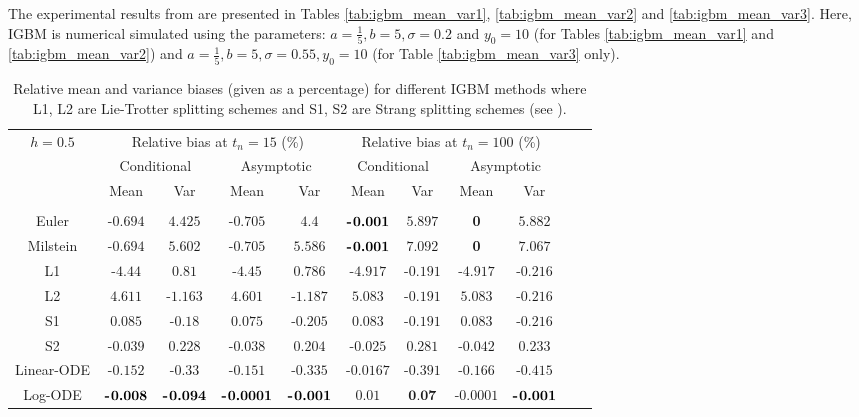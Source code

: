 \documentclass[sn-mathphys-num]{sn-jnl}%
\newcommand{\m}{\hspace{0.25mm}}
\begin{document}
The experimental results from \cite[Table 3]{tubikanec2022igbm} are presented in Tables \ref{tab:igbm_mean_var1}, \ref{tab:igbm_mean_var2} and \ref{tab:igbm_mean_var3}.
Here, IGBM is numerical simulated using the parameters: $a = \frac{1}{5}, b = 5, \sigma  = 0.2$ and $y_0 = 10$ (for Tables \ref{tab:igbm_mean_var1} and \ref{tab:igbm_mean_var2}) and  $a = \frac{1}{5}, b = 5, \sigma  = 0.55, y_0 = 10$ (for Table \ref{tab:igbm_mean_var3} only).\vspace*{-2mm}
\begin{table}[ht]
\centering
\begin{tabular}{ccccccccccc}
\toprule
\multirow{3}{*}{$h = 0.5$} & \multicolumn{4}{c}{Relative bias at $t_n = 15$ (\%)} & \multicolumn{4}{c}{Relative bias at $t_n = 100$ (\%)} \\[1pt]
& \multicolumn{2}{c}{Conditional} & \multicolumn{2}{c}{Asymptotic} & \multicolumn{2}{c}{Conditional} & \multicolumn{2}{c}{Asymptotic} \\
 & Mean & Var & Mean & Var & Mean & Var & Mean & Var \\
\midrule\\[-9pt]
Euler  &  -\m$0.694$ & $4.425$ & -\m$0.705$ & $4.4$ & $\textbf{-\m 0.001}$ & $5.897$ & \textbf{0} & $5.882$ \\[1pt]
Milstein  &  -\m$0.694$ & $5.602$ & -\m$0.705$ & $5.586$ & $\textbf{-\m 0.001}$ & $7.092$ & \textbf{0} & $7.067$ \\[1pt]
L1  &  -\m$4.44$ & $0.81$ & -\m$4.45$ & $0.786$ & -\m$4.917$ & -\m$0.191$ &  -\m$4.917$ & -\m$0.216$ \\[1pt]
L2  &  $4.611$ & -\m$1.163$ & $4.601$ & -$1.187$ & $5.083$ & -\m$0.191$ & $5.083$ & -\m$0.216$ \\[1pt]
S1  &  $0.085$ & -\m$0.18$ & $0.075$ & -$0.205$ & $0.083$ & -\m$0.191$ & $0.083$ & -\m$0.216$ \\[1pt]
S2  &  -\m$0.039$ & $0.228$ & -\m$0.038$ & $0.204$ & -\m$0.025$ & $0.281$ & -\m$0.042$ & $0.233$ \\[1pt]
Linear-ODE  &  -\m$0.152$ & -\m$0.33$ & -$0.151$ & -\m$0.335$ & -\m$0.0167$ & -\m$0.391$ & -\m$0.166$ & -\m$0.415$ \\[1pt]
Log-ODE  &  $\textbf{-\m 0.008}$ & $\textbf{-\m 0.094}$ & $\textbf{-\m 0.0001}$ & $\textbf{-\m 0.001}$ & $0.01$ & $\textbf{0.07}$ & -\m$0.0001$ & $\textbf{-\m 0.001}$ \\
\bottomrule
\end{tabular}\medbreak
\caption{Relative mean and variance biases (given as a percentage) for different IGBM methods where L1, L2 are Lie{\m}-Trotter splitting schemes and S1, S2 are Strang splitting schemes (see \cite{tubikanec2022igbm}).}

\end{table}
\end{document}
